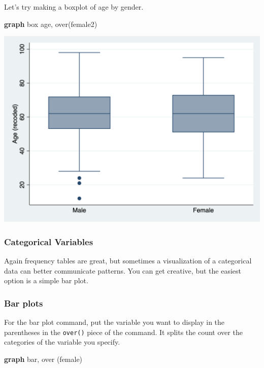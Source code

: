 \documentclass[
]{book}
\newenvironment{Shaded}{\begin{snugshade}}{\end{snugshade}}
\newcommand{\BaseNTok}[1]{\textcolor[rgb]{0.00,0.00,0.81}{#1}}
\newcommand{\KeywordTok}[1]{\textcolor[rgb]{0.13,0.29,0.53}{\textbf{#1}}}
\newcommand{\NormalTok}[1]{#1}
\begin{document}
Let's try making a boxplot of age by gender.

\begin{Shaded}
\begin{Highlighting}[]
\KeywordTok{graph}\NormalTok{ box age, }\BaseNTok{over}\NormalTok{(female2)}
\end{Highlighting}
\end{Shaded}

\includegraphics{images/boxover_stata.png}

\hypertarget{categorical-variables}{%
\subsubsection*{Categorical Variables}\label{categorical-variables}}

Again frequency tables are great, but sometimes a visualization of a categorical data can better communicate patterns. You can get creative, but the easiest option is a simple bar plot.

\hypertarget{barplot2}{%
\subsubsection*{Bar plots}\label{barplot2}}

For the bar plot command, put the variable you want to display in the parentheses in the \texttt{over()} piece of the command. It splits the count over the categories of the variable you specify.

\begin{Shaded}
\begin{Highlighting}[]
\KeywordTok{graph} \BaseNTok{bar}\NormalTok{, }\BaseNTok{over}\NormalTok{ (female)}
\end{Highlighting}
\end{Shaded}
\end{document}

